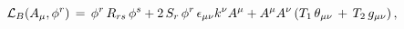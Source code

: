 \begin{equation}
{\cal L}_{B}(A_{\mu},\phi^r) \,=\,\phi^r \,R_{rs}\,\phi^s +2\,S_r\,\phi^r \,\epsilon
_{\mu \nu }k^{\nu }A^{\mu }+A^{\mu }A^{\nu }\left( T_{1}\,\theta _{\mu \nu
}\,+\,T_{2}\,g_{\mu \nu }\right),
\end{equation}


